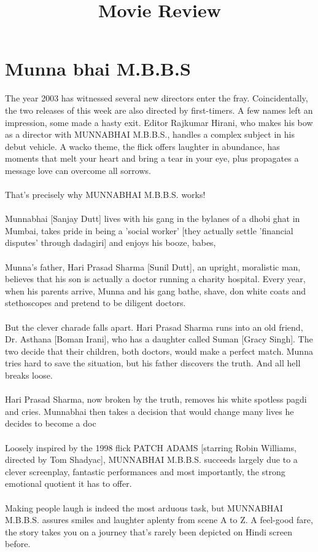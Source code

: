 \documentclass{article}
\title{Movie Review}
\date{}
\begin{document}
\maketitle
\section{Munna bhai M.B.B.S}
The year 2003 has witnessed several new directors enter the fray. Coincidentally, the two releases of this week are also directed by first-timers. A few names left an impression, some made a hasty exit.
Editor Rajkumar Hirani, who makes his bow as a director with MUNNABHAI M.B.B.S., handles a complex subject in his debut vehicle. A wacko theme, the flick offers laughter in abundance, has moments that melt your heart and bring a tear in your eye, plus propagates a message  love can overcome all sorrows.
\\
\\
That's precisely why MUNNABHAI M.B.B.S. works!
\\
\\
Munnabhai [Sanjay Dutt] lives with his gang in the bylanes of a dhobi ghat in Mumbai, takes pride in being a 'social worker' [they actually settle 'financial disputes' through dadagiri] and enjoys his booze, babes,
\\
\\
Munna's father, Hari Prasad Sharma [Sunil Dutt], an upright, moralistic man, believes that his son is actually a doctor running a charity hospital. Every year, when his parents arrive, Munna and his gang bathe, shave, don white coats and stethoscopes and pretend to be diligent doctors.
\\
\\
But the clever charade falls apart. Hari Prasad Sharma runs into an old friend, Dr. Asthana [Boman Irani], who has a daughter called Suman [Gracy Singh]. The two decide that their children, both doctors, would make a perfect match. Munna tries hard to save the situation, but his father discovers the truth. And all hell breaks loose.
\\
\\
Hari Prasad Sharma, now broken by the truth, removes his white spotless pagdi and cries. Munnabhai then takes a decision that would change many lives he decides to become a doc
\\
\\
Loosely inspired by the 1998 flick PATCH ADAMS [starring Robin Williams, directed by Tom Shadyac], MUNNABHAI M.B.B.S. succeeds largely due to a clever screenplay, fantastic performances and most importantly, the strong emotional quotient it has to offer.
\\
\\
Making people laugh is indeed the most arduous task, but MUNNABHAI M.B.B.S. assures smiles and laughter aplenty from scene A to Z. A feel-good fare, the story takes you on a journey that's rarely been depicted on Hindi screen before.
\end{document}
